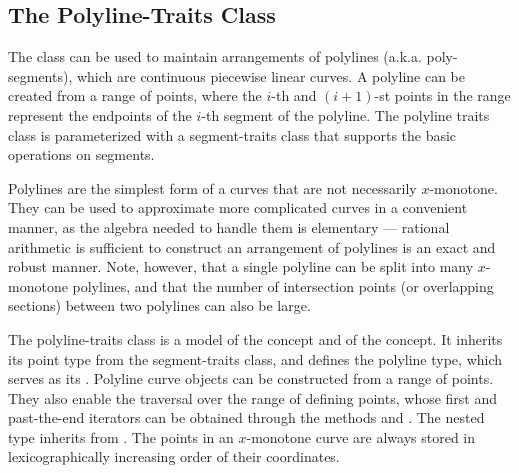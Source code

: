 
\subsection{The Polyline-Traits Class}
\label{arr_ssec:tr_polylines}

The  class can be used
to maintain arrangements of polylines (a.k.a. poly-segments),
which are continuous piecewise linear curves. A polyline can be
created from a range of points, where the $i$-th and $(i+1)$-st
points in the range represent the endpoints of the $i$-th segment
of the polyline. The polyline traits class is parameterized with a
segment-traits class that supports the basic operations on
segments.

Polylines are the simplest form of a curves that are not
necessarily $x$-monotone. They can be used to approximate more
complicated curves in a convenient manner, as the algebra needed
to handle them is elementary --- rational arithmetic is sufficient
to construct an arrangement of polylines is an exact and robust
manner. Note, however, that a single polyline can be split into
many $x$-monotone polylines, and that the number of intersection
points (or overlapping sections) between two polylines can also
be large. 

The polyline-traits class is a model of the 
concept and of the  concept.
It inherits its point type from the segment-traits class, and defines
the polyline type, which serves as its . Polyline curve
objects can be constructed from a range of points. They also enable
the traversal over the range of defining points, whose first and
past-the-end iterators can be obtained through the methods 
and . The nested  type inherits
from . The points in an $x$-monotone curve are
always stored in lexicographically increasing order of their
coordinates.

